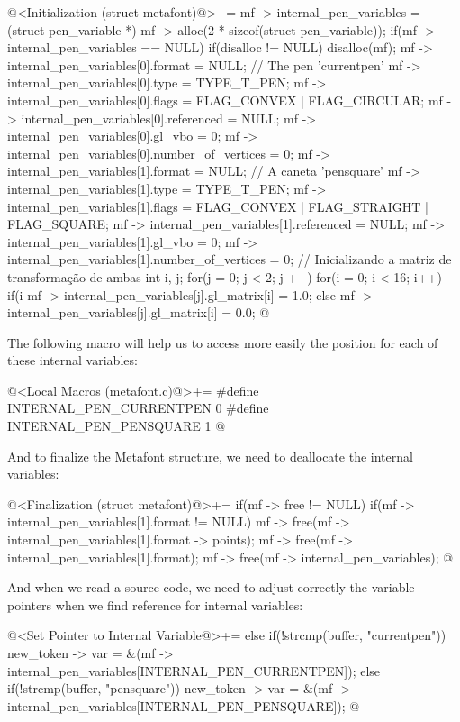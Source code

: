 \iniciocodigo
@<Initialization (struct metafont)@>+=
mf -> internal_pen_variables = (struct pen_variable *)
                                 mf -> alloc(2 * sizeof(struct pen_variable));
if(mf -> internal_pen_variables == NULL){
  if(disalloc != NULL)
    disalloc(mf);
}
mf -> internal_pen_variables[0].format = NULL; // The pen 'currentpen'
mf -> internal_pen_variables[0].type = TYPE_T_PEN;
mf -> internal_pen_variables[0].flags = FLAG_CONVEX | FLAG_CIRCULAR;
mf -> internal_pen_variables[0].referenced = NULL;
mf -> internal_pen_variables[0].gl_vbo = 0;
mf -> internal_pen_variables[0].number_of_vertices = 0;
mf -> internal_pen_variables[1].format = NULL; // A caneta 'pensquare'
mf -> internal_pen_variables[1].type = TYPE_T_PEN;
mf -> internal_pen_variables[1].flags = FLAG_CONVEX | FLAG_STRAIGHT |
                                        FLAG_SQUARE;
mf -> internal_pen_variables[1].referenced = NULL;
mf -> internal_pen_variables[1].gl_vbo = 0;
mf -> internal_pen_variables[1].number_of_vertices = 0;
{ // Inicializando a matriz de transformação de ambas
  int i, j;
  for(j = 0; j < 2; j ++)
    for(i = 0; i < 16; i++)
      if(i %
        mf -> internal_pen_variables[j].gl_matrix[i] = 1.0;
      else
        mf -> internal_pen_variables[j].gl_matrix[i] = 0.0;
}
@
\fimcodigo

The following macro will help us to access more easily the position
for each of these internal variables:

\iniciocodigo
@<Local Macros (metafont.c)@>+=
#define INTERNAL_PEN_CURRENTPEN 0
#define INTERNAL_PEN_PENSQUARE  1
@
\fimcodigo

And to finalize the Metafont structure, we need to deallocate the
internal variables:

\iniciocodigo
@<Finalization (struct metafont)@>+=
if(mf -> free != NULL){
  if(mf -> internal_pen_variables[1].format != NULL){
    mf -> free(mf -> internal_pen_variables[1].format -> points);
    mf -> free(mf -> internal_pen_variables[1].format);
  }
  mf -> free(mf -> internal_pen_variables);
}
@
\fimcodigo

And when we read a source code, we need to adjust correctly the
variable pointers when we find reference for internal variables:


\iniciocodigo
@<Set Pointer to Internal Variable@>+=
else if(!strcmp(buffer, "currentpen"))
  new_token -> var =
          &(mf -> internal_pen_variables[INTERNAL_PEN_CURRENTPEN]);
else if(!strcmp(buffer, "pensquare"))
  new_token -> var =
          &(mf -> internal_pen_variables[INTERNAL_PEN_PENSQUARE]);
@
\fimcodigo

